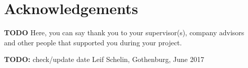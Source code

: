 \thispagestyle{plain}			%
\section*{Acknowledgements}
\textbf{TODO}
Here, you can say thank you to your supervisor(s), company advisors and other people that supported you during your project.

\vspace{1.5cm}
\hfill
\textbf{TODO:} check/update date
Leif Schelin, Gothenburg, June 2017

\newpage				%
\thispagestyle{empty}
\mbox{}